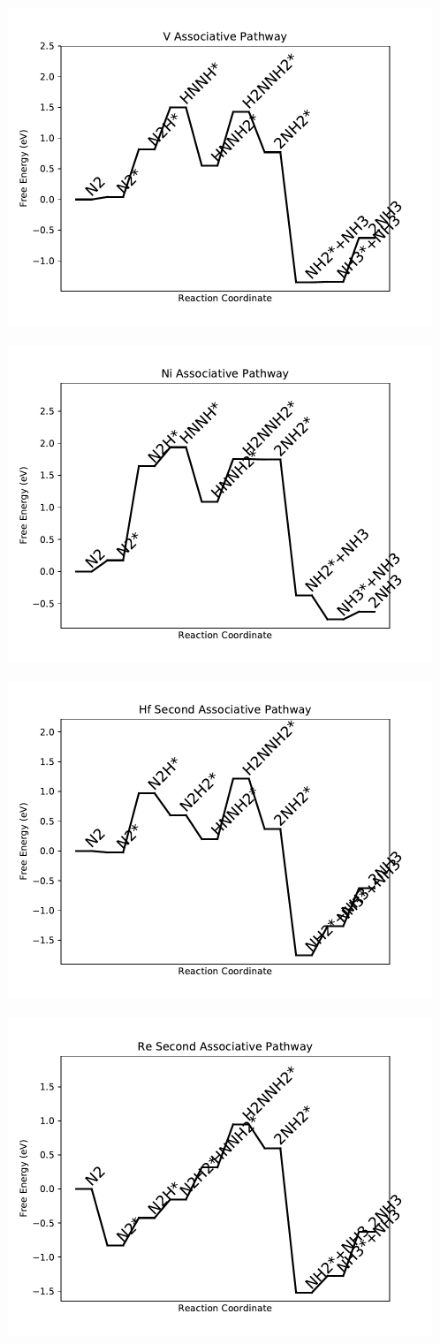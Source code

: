 \documentclass[journal=jacsat,manuscript=article]{achemso}
\begin{document}
\begin{figure}
\includegraphics[width=0.5\linewidth]{data/plots/V_associative.pdf}
\label{fig:V_associative}
\end{figure}

\newpage
\begin{figure}
\includegraphics[width=0.5\linewidth]{data/plots/Ni_associative.pdf}
\label{fig:Ni_associative}
\end{figure}

\begin{figure}
\includegraphics[width=0.5\linewidth]{data/plots/Hf_associative_2.pdf}
\label{fig:Hf_associative_2}
\end{figure}

\newpage
\begin{figure}
\includegraphics[width=0.5\linewidth]{data/plots/Re_associative_2.pdf}
\label{fig:Re_associative_2}
\end{figure}
\end{document}
